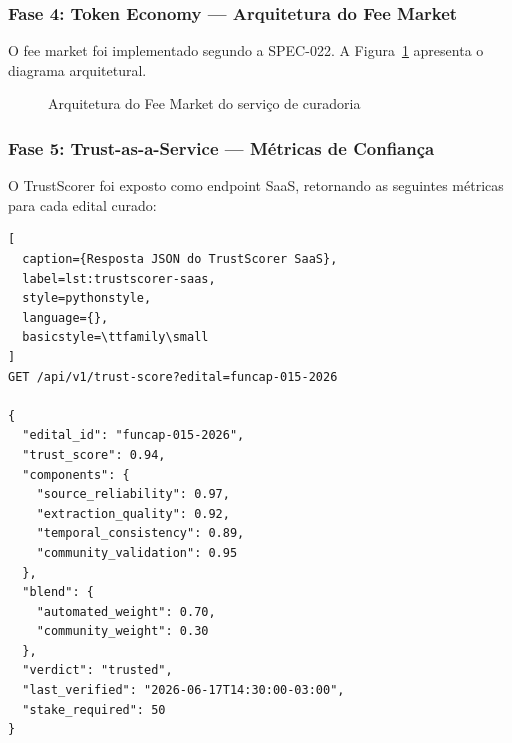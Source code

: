 \subsubsection{Fase 4: Token Economy --- Arquitetura do Fee Market}

O fee market foi implementado segundo a SPEC-022. A
Figura~\ref{fig:fee-market} apresenta o diagrama arquitetural.

\begin{figure}[htb]
\centering
\caption{Arquitetura do Fee Market do serviço de curadoria}
\label{fig:fee-market}
\end{figure}

\subsubsection{Fase 5: Trust-as-a-Service --- Métricas de Confiança}

O TrustScorer foi exposto como endpoint SaaS, retornando as seguintes
métricas para cada edital curado:

\begin{lstlisting}[
  caption={Resposta JSON do TrustScorer SaaS},
  label=lst:trustscorer-saas,
  style=pythonstyle,
  language={},
  basicstyle=\ttfamily\small
]
GET /api/v1/trust-score?edital=funcap-015-2026

{
  "edital_id": "funcap-015-2026",
  "trust_score": 0.94,
  "components": {
    "source_reliability": 0.97,
    "extraction_quality": 0.92,
    "temporal_consistency": 0.89,
    "community_validation": 0.95
  },
  "blend": {
    "automated_weight": 0.70,
    "community_weight": 0.30
  },
  "verdict": "trusted",
  "last_verified": "2026-06-17T14:30:00-03:00",
  "stake_required": 50
}
\end{lstlisting}

